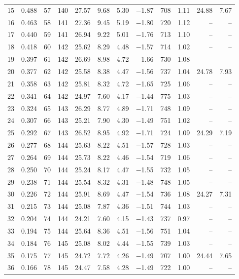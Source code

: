 \begin{table}[H]
\begin{tabular}{rrrrrrrrrrrr}
15 & 0.488 & 57 & 140 & 27.57 & 9.68 & 5.30 & $-$1.87 & 708 & 1.11 & 24.88 & 7.67 \\
16 & 0.463 & 58 & 141 & 27.36 & 9.45 & 5.19 & $-$1.80 & 720 & 1.12 & -- & -- \\
17 & 0.440 & 59 & 141 & 26.94 & 9.22 & 5.01 & $-$1.76 & 713 & 1.10 & -- & -- \\
18 & 0.418 & 60 & 142 & 25.62 & 8.29 & 4.48 & $-$1.57 & 714 & 1.02 & -- & -- \\
19 & 0.397 & 61 & 142 & 26.69 & 8.98 & 4.72 & $-$1.66 & 730 & 1.08 & -- & -- \\
20 & 0.377 & 62 & 142 & 25.58 & 8.38 & 4.47 & $-$1.56 & 737 & 1.04 & 24.78 & 7.93 \\
21 & 0.358 & 63 & 142 & 25.81 & 8.32 & 4.72 & $-$1.65 & 725 & 1.06 & -- & -- \\
22 & 0.341 & 64 & 142 & 24.97 & 7.60 & 4.17 & $-$1.44 & 775 & 1.03 & -- & -- \\
23 & 0.324 & 65 & 143 & 26.29 & 8.77 & 4.89 & $-$1.71 & 748 & 1.09 & -- & -- \\
24 & 0.307 & 66 & 143 & 25.21 & 7.90 & 4.30 & $-$1.49 & 751 & 1.02 & -- & -- \\
25 & 0.292 & 67 & 143 & 26.52 & 8.95 & 4.92 & $-$1.71 & 724 & 1.09 & 24.29 & 7.19 \\
26 & 0.277 & 68 & 144 & 25.63 & 8.22 & 4.51 & $-$1.57 & 728 & 1.03 & -- & -- \\
27 & 0.264 & 69 & 144 & 25.73 & 8.22 & 4.46 & $-$1.54 & 719 & 1.06 & -- & -- \\
28 & 0.250 & 70 & 144 & 25.24 & 8.17 & 4.47 & $-$1.55 & 732 & 1.05 & -- & -- \\
29 & 0.238 & 71 & 144 & 25.54 & 8.32 & 4.31 & $-$1.48 & 748 & 1.05 & -- & -- \\
30 & 0.226 & 72 & 144 & 25.91 & 8.69 & 4.47 & $-$1.54 & 736 & 1.08 & 24.27 & 7.31 \\
31 & 0.215 & 73 & 144 & 25.08 & 7.87 & 4.36 & $-$1.51 & 744 & 1.03 & -- & -- \\
32 & 0.204 & 74 & 144 & 24.21 & 7.60 & 4.15 & $-$1.43 & 737 & 0.97 & -- & -- \\
33 & 0.194 & 75 & 144 & 25.64 & 8.36 & 4.51 & $-$1.56 & 751 & 1.04 & -- & -- \\
34 & 0.184 & 76 & 145 & 25.08 & 8.02 & 4.44 & $-$1.55 & 739 & 1.03 & -- & -- \\
35 & 0.175 & 77 & 145 & 24.72 & 7.72 & 4.26 & $-$1.49 & 707 & 1.00 & 24.44 & 7.65 \\
36 & 0.166 & 78 & 145 & 24.47 & 7.58 & 4.28 & $-$1.49 & 722 & 1.00 & -- & -- \\

\end{tabular}
\end{table}
